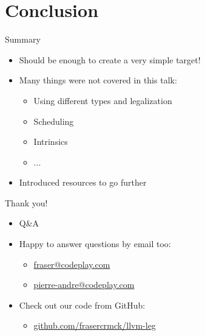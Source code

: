 \documentclass[pdf]{beamer}
\begin{document}







\section{Conclusion}

\begin{frame}{Summary}

\begin{itemize}
    \item Should be enough to create a very simple target!
    \item Many things were not covered in this talk:
    \begin{itemize}
        \item Using different types and legalization
        \item Scheduling
        \item Intrinsics
        \item ...
    \end{itemize}
    \item Introduced resources to go further
\end{itemize}

\end{frame}


\begin{frame}{Thank you!}

\begin{itemize}
    \item Q\&A
    \item Happy to answer questions by email too:
    \begin{itemize}
        \item \url{fraser@codeplay.com}
        \item \url{pierre-andre@codeplay.com}
    \end{itemize}
    \item Check out our code from GitHub:
    \begin{itemize}
        \item \url{github.com/frasercrmck/llvm-leg}
    \end{itemize}
\end{itemize}

\end{frame}

\end{document}
